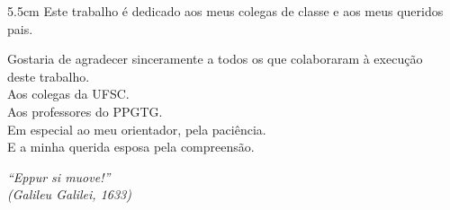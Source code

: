 \documentclass[
	12pt,				%
	oneside,			%
	a4paper,			%
	chapter=TITLE,		%
	section=TITLE,		%
	english,			%
	brazil				%
	]{abntex2}
\begin{document}
\begin{dedicatoria}
	\vspace*{\fill}
	\noindent
	\begin{adjustwidth*}{}{5.5cm} 
		\raggedleft       
		Este trabalho é dedicado aos meus colegas de classe e aos meus queridos pais.
	\end{adjustwidth*}
\end{dedicatoria}

\begin{agradecimentos}
	Gostaria de agradecer sinceramente a todos os que colaboraram à execução\\
 deste trabalho.\\
 Aos colegas da UFSC.\\
 Aos professores do PPGTG.\\
 Em especial ao meu orientador, pela paciência.\\
 E a minha querida esposa pela compreensão.
\end{agradecimentos}

\begin{epigrafe}
	\vspace*{\fill}
	\begin{flushright}
		\textit{``Eppur si muove!''\\
(Galileu Galilei, 1633)}
	\end{flushright}
\end{epigrafe}

\end{document}

